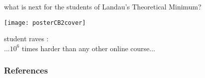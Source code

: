 \begin{frame}{
what is next for the students of Landau's Theoretical Minimum?
\\
}
\begin{center}
\texttt{[image: posterCB2cover]}
\end{center}
\vfill
student raves : \\
...$10^6$ times harder than any other online course...
\end{frame}

\begin{frame}[t, allowframebreaks]
  \frametitle{References}
  \scriptsize{ %
  \printbibliography
   } %
\end{frame}


